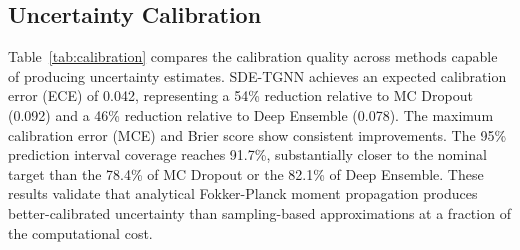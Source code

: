 \documentclass[journal]{IEEEtran}
\begin{document}
\begin{table}[!t]
\centering
\caption{Detection Performance Across Six Datasets (Weighted F1 \%)}
\label{tab:detection}
\footnotesize
{}
\end{table}


\subsection{Uncertainty Calibration}

Table~\ref{tab:calibration} compares the calibration quality across methods capable of producing uncertainty estimates. SDE-TGNN achieves an expected calibration error (ECE) of 0.042, representing a 54\% reduction relative to MC Dropout (0.092) and a 46\% reduction relative to Deep Ensemble (0.078). The maximum calibration error (MCE) and Brier score show consistent improvements. The 95\% prediction interval coverage reaches 91.7\%, substantially closer to the nominal target than the 78.4\% of MC Dropout or the 82.1\% of Deep Ensemble. These results validate that analytical Fokker-Planck moment propagation produces better-calibrated uncertainty than sampling-based approximations at a fraction of the computational cost.
\end{document}
